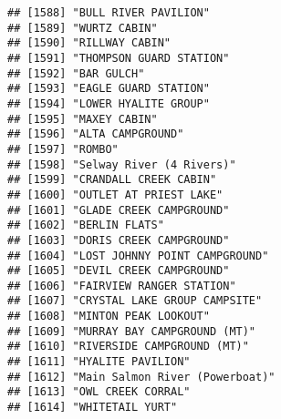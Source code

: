 \documentclass[
]{article}
\begin{document}
\begin{verbatim}
## [1588] "BULL RIVER PAVILION"                                                                 
## [1589] "WURTZ CABIN"                                                                         
## [1590] "RILLWAY CABIN"                                                                       
## [1591] "THOMPSON GUARD STATION"                                                              
## [1592] "BAR GULCH"                                                                           
## [1593] "EAGLE GUARD STATION"                                                                 
## [1594] "LOWER HYALITE GROUP"                                                                 
## [1595] "MAXEY CABIN"                                                                         
## [1596] "ALTA CAMPGROUND"                                                                     
## [1597] "ROMBO"                                                                               
## [1598] "Selway River (4 Rivers)"                                                             
## [1599] "CRANDALL CREEK CABIN"                                                                
## [1600] "OUTLET AT PRIEST LAKE"                                                               
## [1601] "GLADE CREEK CAMPGROUND"                                                              
## [1602] "BERLIN FLATS"                                                                        
## [1603] "DORIS CREEK CAMPGROUND"                                                              
## [1604] "LOST JOHNNY POINT CAMPGROUND"                                                        
## [1605] "DEVIL CREEK CAMPGROUND"                                                              
## [1606] "FAIRVIEW RANGER STATION"                                                             
## [1607] "CRYSTAL LAKE GROUP CAMPSITE"                                                         
## [1608] "MINTON PEAK LOOKOUT"                                                                 
## [1609] "MURRAY BAY CAMPGROUND (MT)"                                                          
## [1610] "RIVERSIDE CAMPGROUND (MT)"                                                           
## [1611] "HYALITE PAVILION"                                                                    
## [1612] "Main Salmon River (Powerboat)"                                                       
## [1613] "OWL CREEK CORRAL"                                                                    
## [1614] "WHITETAIL YURT"                                                                      

\end{verbatim}
\end{document}

